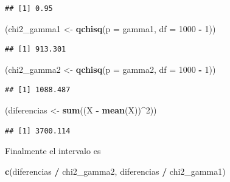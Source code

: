 \documentclass[
  12pt,
]{book}
\newenvironment{Shaded}{\begin{snugshade}}{\end{snugshade}}
\newcommand{\DataTypeTok}[1]{\textcolor[rgb]{0.13,0.29,0.53}{#1}}
\newcommand{\DecValTok}[1]{\textcolor[rgb]{0.00,0.00,0.81}{#1}}
\newcommand{\KeywordTok}[1]{\textcolor[rgb]{0.13,0.29,0.53}{\textbf{#1}}}
\newcommand{\NormalTok}[1]{#1}
\newcommand{\OperatorTok}[1]{\textcolor[rgb]{0.81,0.36,0.00}{\textbf{#1}}}
\newcommand{\StringTok}[1]{\textcolor[rgb]{0.31,0.60,0.02}{#1}}
\begin{document}
\begin{verbatim}
## [1] 0.95
\end{verbatim}

\begin{Shaded}
\begin{Highlighting}[]
\NormalTok{(chi2\_gamma1 \textless{}{-}}\StringTok{ }\KeywordTok{qchisq}\NormalTok{(}\DataTypeTok{p =}\NormalTok{ gamma1, }\DataTypeTok{df =} \DecValTok{1000} \OperatorTok{{-}}\StringTok{ }\DecValTok{1}\NormalTok{))}
\end{Highlighting}
\end{Shaded}

\begin{verbatim}
## [1] 913.301
\end{verbatim}

\begin{Shaded}
\begin{Highlighting}[]
\NormalTok{(chi2\_gamma2 \textless{}{-}}\StringTok{ }\KeywordTok{qchisq}\NormalTok{(}\DataTypeTok{p =}\NormalTok{ gamma2, }\DataTypeTok{df =} \DecValTok{1000} \OperatorTok{{-}}\StringTok{ }\DecValTok{1}\NormalTok{))}
\end{Highlighting}
\end{Shaded}

\begin{verbatim}
## [1] 1088.487
\end{verbatim}

\begin{Shaded}
\begin{Highlighting}[]
\NormalTok{(diferencias \textless{}{-}}\StringTok{ }\KeywordTok{sum}\NormalTok{((X }\OperatorTok{{-}}\StringTok{ }\KeywordTok{mean}\NormalTok{(X))}\OperatorTok{\^{}}\DecValTok{2}\NormalTok{))}
\end{Highlighting}
\end{Shaded}

\begin{verbatim}
## [1] 3700.114
\end{verbatim}

Finalmente el intervalo es

\begin{Shaded}
\begin{Highlighting}[]
\KeywordTok{c}\NormalTok{(diferencias }\OperatorTok{/}\StringTok{ }\NormalTok{chi2\_gamma2, diferencias }\OperatorTok{/}\StringTok{ }\NormalTok{chi2\_gamma1)}
\end{Highlighting}
\end{Shaded}
\end{document}
